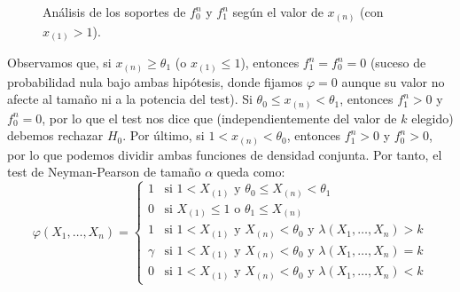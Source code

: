 \begin{ejercicio}
\begin{description}
\begin{figure}[h]
            \caption{Análisis de los soportes de $f_0^n$ y $f_1^n$ según el valor de $x_{(n)}$ (con $x_{(1)}>1$).}
            \label{fig:densidades_conjuntas_ej7.7.1}
        \end{figure}

        Observamos que, si $x_{(n)} \geq \theta_1$ (o $x_{(1)} \leq 1$), entonces $f_1^n = f_0^n = 0$ (suceso de probabilidad nula bajo ambas hipótesis, donde fijamos $\varphi = 0$ aunque su valor no afecte al tamaño ni a la potencia del test). Si $\theta_0 \leq x_{(n)} < \theta_1$, entonces $f_1^n > 0$ y $f_0^n = 0$, por lo que el test nos dice que (independientemente del valor de $k$ elegido) debemos rechazar $H_0$. Por último, si $1 < x_{(n)} < \theta_0$, entonces $f_1^n > 0$ y $f_0^n > 0$, por lo que podemos dividir ambas funciones de densidad conjunta. Por tanto, el test de Neyman-Pearson de tamaño $\alpha$ queda como:
        \begin{equation*}
            \varphi(X_1, \ldots, X_n) = \left\{\begin{array}{ll}
                1 & \text{si\ } 1 < X_{(1)} \text{\ y\ } \theta_0 \leq X_{(n)} < \theta_1 \\
                0 & \text{si\ } X_{(1)} \leq 1 \text{\ o\ } \theta_1 \leq X_{(n)} \\
                1 & \text{si\ } 1 < X_{(1)} \text{\ y\ } X_{(n)} < \theta_0 \text{\ y\ } \lambda(X_1, \ldots, X_n) > k \\
                \gamma & \text{si\ } 1 < X_{(1)} \text{\ y\ } X_{(n)} < \theta_0 \text{\ y\ } \lambda(X_1, \ldots, X_n) = k \\
                0 & \text{si\ } 1 < X_{(1)} \text{\ y\ } X_{(n)} < \theta_0 \text{\ y\ } \lambda(X_1, \ldots, X_n) < k
            \end{array}\right.
        \end{equation*}


\end{description}
\end{ejercicio}
